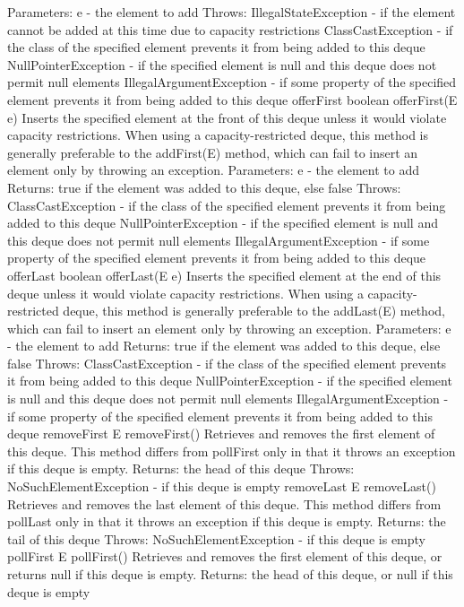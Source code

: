 \documentclass{book}
\begin{document}
Parameters:
e - the element to add
Throws:
IllegalStateException - if the element cannot be added at this time due to capacity restrictions
ClassCastException - if the class of the specified element prevents it from being added to this deque
NullPointerException - if the specified element is null and this deque does not permit null elements
IllegalArgumentException - if some property of the specified element prevents it from being added to this deque
offerFirst
boolean offerFirst(E e)
Inserts the specified element at the front of this deque unless it would violate capacity restrictions. When using a capacity-restricted deque, this method is generally preferable to the addFirst(E) method, which can fail to insert an element only by throwing an exception.
Parameters:
e - the element to add
Returns:
true if the element was added to this deque, else false
Throws:
ClassCastException - if the class of the specified element prevents it from being added to this deque
NullPointerException - if the specified element is null and this deque does not permit null elements
IllegalArgumentException - if some property of the specified element prevents it from being added to this deque
offerLast
boolean offerLast(E e)
Inserts the specified element at the end of this deque unless it would violate capacity restrictions. When using a capacity-restricted deque, this method is generally preferable to the addLast(E) method, which can fail to insert an element only by throwing an exception.
Parameters:
e - the element to add
Returns:
true if the element was added to this deque, else false
Throws:
ClassCastException - if the class of the specified element prevents it from being added to this deque
NullPointerException - if the specified element is null and this deque does not permit null elements
IllegalArgumentException - if some property of the specified element prevents it from being added to this deque
removeFirst
E removeFirst()
Retrieves and removes the first element of this deque. This method differs from pollFirst only in that it throws an exception if this deque is empty.
Returns:
the head of this deque
Throws:
NoSuchElementException - if this deque is empty
removeLast
E removeLast()
Retrieves and removes the last element of this deque. This method differs from pollLast only in that it throws an exception if this deque is empty.
Returns:
the tail of this deque
Throws:
NoSuchElementException - if this deque is empty
pollFirst
E pollFirst()
Retrieves and removes the first element of this deque, or returns null if this deque is empty.
Returns:
the head of this deque, or null if this deque is empty
\end{document}
